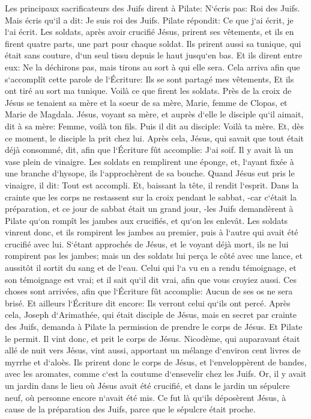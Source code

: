 \verse Les principaux sacrificateurs des Juifs dirent à Pilate: N`écris pas: Roi des Juifs. Mais écris qu`il a dit: Je suis roi des Juifs. 
\verse Pilate répondit: Ce que j`ai écrit, je l`ai écrit. 
\verse Les soldats, après avoir crucifié Jésus, prirent ses vêtements, et ils en firent quatre parts, une part pour chaque soldat. Ils prirent aussi sa tunique, qui était sans couture, d`un seul tissu depuis le haut jusqu`en bas. Et ils dirent entre eux: 
\verse Ne la déchirons pas, mais tirons au sort à qui elle sera. Cela arriva afin que s`accomplît cette parole de l`Écriture: Ils se sont partagé mes vêtements, Et ils ont tiré au sort ma tunique. Voilà ce que firent les soldats. 
\verse Près de la croix de Jésus se tenaient sa mère et la soeur de sa mère, Marie, femme de Clopas, et Marie de Magdala. 
\verse Jésus, voyant sa mère, et auprès d`elle le disciple qu`il aimait, dit à sa mère: Femme, voilà ton fils. 
\verse Puis il dit au disciple: Voilà ta mère. Et, dès ce moment, le disciple la prit chez lui. 
\verse Après cela, Jésus, qui savait que tout était déjà consommé, dit, afin que l`Écriture fût accomplie: J`ai soif. 
\verse Il y avait là un vase plein de vinaigre. Les soldats en remplirent une éponge, et, l`ayant fixée à une branche d`hysope, ils l`approchèrent de sa bouche. 
\verse Quand Jésus eut pris le vinaigre, il dit: Tout est accompli. Et, baissant la tête, il rendit l`esprit. 
\verse Dans la crainte que les corps ne restassent sur la croix pendant le sabbat, -car c`était la préparation, et ce jour de sabbat était un grand jour, -les Juifs demandèrent à Pilate qu`on rompît les jambes aux crucifiés, et qu`on les enlevât. 
\verse Les soldats vinrent donc, et ils rompirent les jambes au premier, puis à l`autre qui avait été crucifié avec lui. 
\verse S`étant approchés de Jésus, et le voyant déjà mort, ils ne lui rompirent pas les jambes; 
\verse mais un des soldats lui perça le côté avec une lance, et aussitôt il sortit du sang et de l`eau. 
\verse Celui qui l`a vu en a rendu témoignage, et son témoignage est vrai; et il sait qu`il dit vrai, afin que vous croyiez aussi. 
\verse Ces choses sont arrivées, afin que l`Écriture fût accomplie: Aucun de ses os ne sera brisé. 
\verse Et ailleurs l`Écriture dit encore: Ils verront celui qu`ils ont percé. 
\verse Après cela, Joseph d`Arimathée, qui était disciple de Jésus, mais en secret par crainte des Juifs, demanda à Pilate la permission de prendre le corps de Jésus. Et Pilate le permit. Il vint donc, et prit le corps de Jésus. 
\verse Nicodème, qui auparavant était allé de nuit vers Jésus, vint aussi, apportant un mélange d`environ cent livres de myrrhe et d`aloès. 
\verse Ils prirent donc le corps de Jésus, et l`enveloppèrent de bandes, avec les aromates, comme c`est la coutume d`ensevelir chez les Juifs. 
\verse Or, il y avait un jardin dans le lieu où Jésus avait été crucifié, et dans le jardin un sépulcre neuf, où personne encore n`avait été mis. 
\verse Ce fut là qu`ils déposèrent Jésus, à cause de la préparation des Juifs, parce que le sépulcre était proche. 

